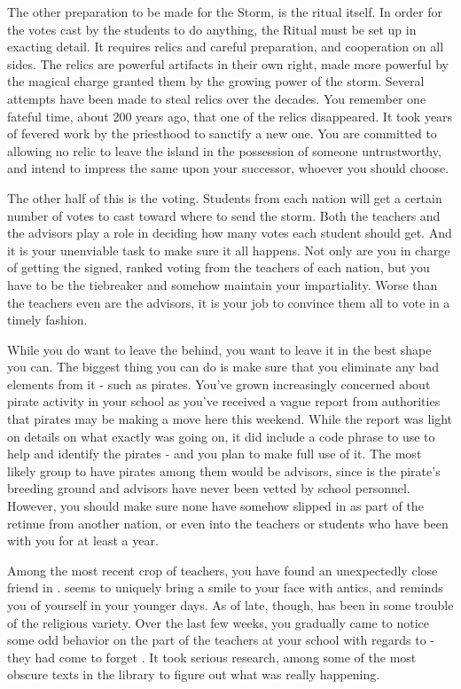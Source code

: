 \documentclass[char]{GL2020}
\begin{document}
The other preparation to be made for the Storm, is the ritual itself. In order for the votes cast by the students to do anything, the Ritual must be set up in exacting detail. It requires relics and careful preparation, and cooperation on all sides. The relics are powerful artifacts in their own right, made more powerful by the magical charge granted them by the growing power of the storm. Several attempts have been made to steal relics over the decades. You remember one fateful time, about 200 years ago, that one of the \pFarm{} relics disappeared. It took years of fevered work by the priesthood to sanctify a new one. You are committed to allowing no relic to leave the island in the possession of someone untrustworthy, and intend to impress the same upon your successor, whoever you should choose.

The other half of this is the voting. Students from each nation will get a certain number of votes to cast toward where to send the storm. Both the teachers and the advisors play a role in deciding how many votes each student should get. And it is your unenviable task to make sure it all happens. Not only are you in charge of getting the signed, ranked voting from the teachers of each nation, but you have to be the tiebreaker and somehow maintain your impartiality. Worse than the teachers even are the advisors, it is your job to convince them all to vote in a timely fashion.

While you do want to leave the \pSc{} behind, you want to leave it in the best shape you can. The biggest thing you can do is make sure that you eliminate any bad elements from it - such as pirates. You've grown increasingly concerned about pirate activity in your school as you've received a vague report from \pShip{} authorities that pirates may be making a move here this weekend. While the report was light on details on what exactly was going on, it did include a code phrase to use to help and identify the pirates - and you plan to make full use of it. The most likely group to have pirates among them would be \pShip{} advisors, since \pShip{} is the pirate's breeding ground and advisors have never been vetted by school personnel. However, you should make sure none have somehow slipped in as part of the retinue from another nation, or even into the teachers or students who have been with you for at least a year.

Among the most recent crop of teachers, you have found an unexpectedly close friend in \cChupAvenger{}. \cChupAvenger{} seems to uniquely bring a smile to your face with \cChupAvenger{\their} antics, and reminds you of yourself in your younger days. As of late, though, \cChupAvenger{} has been in some trouble of the religious variety. Over the last few weeks, you gradually came to notice some odd behavior on the part of the teachers at your school with regards to \cChupAvenger{} - they had come to forget \cChupAvenger{\them}. It took serious research, among some of the most obscure texts in the library to figure out what was really happening. 
\end{document}
